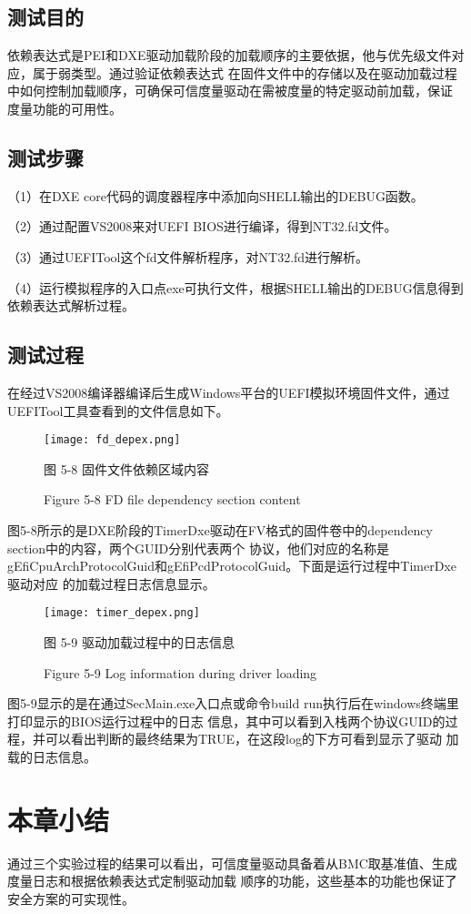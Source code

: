 \subsection{测试目的}
依赖表达式是PEI和DXE驱动加载阶段的加载顺序的主要依据，他与优先级文件对应，属于弱类型。通过验证依赖表达式
在固件文件中的存储以及在驱动加载过程中如何控制加载顺序，可确保可信度量驱动在需被度量的特定驱动前加载，保证
度量功能的可用性。

\subsection{测试步骤}
（1）在DXE core代码的调度器程序中添加向SHELL输出的DEBUG函数。
\par （2）通过配置VS2008来对UEFI BIOS进行编译，得到NT32.fd文件。
\par （3）通过UEFITool这个fd文件解析程序，对NT32.fd进行解析。
\par （4）运行模拟程序的入口点exe可执行文件，根据SHELL输出的DEBUG信息得到依赖表达式解析过程。

\subsection{测试过程}
在经过VS2008编译器编译后生成Windows平台的UEFI模拟环境固件文件，通过UEFITool工具查看到的文件信息如下。

\begin{figure}[H]
    \label{ffs_format}
    \vspace{0cm}   
    \setlength{\abovecaptionskip}{0.3cm}
	\centering
    \texttt{[image: fd\_depex.png]}
    \caption*{图 5-8 固件文件依赖区域内容}
    \setlength{\belowcaptionskip}{-0.7cm}
    \caption*{Figure 5-8 FD file dependency section content}
\end{figure}

图5-8所示的是DXE阶段的TimerDxe驱动在FV格式的固件卷中的dependency section中的内容，两个GUID分别代表两个
协议，他们对应的名称是gEfiCpuArchProtocolGuid和gEfiPcdProtocolGuid。下面是运行过程中TimerDxe驱动对应
的加载过程日志信息显示。

\begin{figure}[H]
    \label{ffs_format}
    \vspace{0cm}   
    \setlength{\abovecaptionskip}{0.3cm}
	\centering
    \texttt{[image: timer\_depex.png]}
    \caption*{图 5-9 驱动加载过程中的日志信息}
    \setlength{\belowcaptionskip}{-0.7cm}
    \caption*{Figure 5-9 Log information during driver loading}
\end{figure}

图5-9显示的是在通过SecMain.exe入口点或命令build run执行后在windows终端里打印显示的BIOS运行过程中的日志
信息，其中可以看到入栈两个协议GUID的过程，并可以看出判断的最终结果为TRUE，在这段log的下方可看到显示了驱动
加载的日志信息。

%
%
\section{本章小结}
通过三个实验过程的结果可以看出，可信度量驱动具备着从BMC取基准值、生成度量日志和根据依赖表达式定制驱动加载
顺序的功能，这些基本的功能也保证了安全方案的可实现性。

